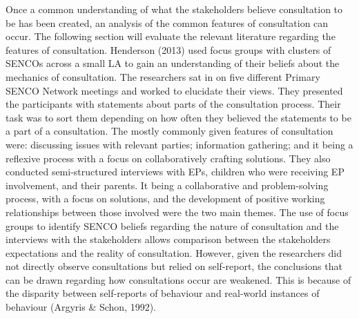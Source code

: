 \documentclass[
  english,
  man]{apa}
\begin{document}
Once a common understanding of what the stakeholders believe consultation to be has been created, an analysis of the common features of consultation can occur. The following section will evaluate the relevant literature regarding the features of consultation. Henderson (2013) used focus groups with clusters of SENCOs across a small LA to gain an understanding of their beliefs about the mechanics of consultation. The researchers sat in on five different Primary SENCO Network meetings and worked to elucidate their views. They presented the participants with statements about parts of the consultation process. Their task was to sort them depending on how often they believed the statements to be a part of a consultation. The mostly commonly given features of consultation were: discussing issues with relevant parties; information gathering; and it being a reflexive process with a focus on collaboratively crafting solutions. They also conducted semi-structured interviews with EPs, children who were receiving EP involvement, and their parents. It being a collaborative and problem-solving process, with a focus on solutions, and the development of positive working relationships between those involved were the two main themes. The use of focus groups to identify SENCO beliefs regarding the nature of consultation and the interviews with the stakeholders allows comparison between the stakeholders expectations and the reality of consultation. However, given the researchers did not directly observe consultations but relied on self-report, the conclusions that can be drawn regarding how consultations occur are weakened. This is because of the disparity between self-reports of behaviour and real-world instances of behaviour (Argyris \& Schon, 1992).
\end{document}
